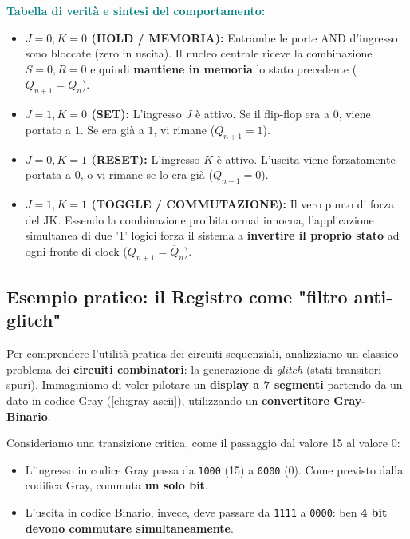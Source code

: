 \medskip
\noindent\textcolor{teal}{\textbf{Tabella di verità e sintesi del comportamento:}}
\begin{itemize}[leftmargin=1.5em,itemsep=4pt]
  \item \textbf{$J = 0, K = 0$ (HOLD / MEMORIA):} Entrambe le porte AND d'ingresso sono bloccate (zero in uscita). Il nucleo centrale riceve la combinazione $S=0, R=0$ e quindi \textbf{mantiene in memoria} lo stato precedente ($Q_{n+1}=Q_n$).
  \item \textbf{$J = 1, K = 0$ (SET):} L'ingresso $J$ è attivo. Se il flip-flop era a $0$, viene portato a $1$. Se era già a $1$, vi rimane ($Q_{n+1}=1$).
  \item \textbf{$J = 0, K = 1$ (RESET):} L'ingresso $K$ è attivo. L'uscita viene forzatamente portata a $0$, o vi rimane se lo era già ($Q_{n+1}=0$).
  \item \textbf{$J = 1, K = 1$ (TOGGLE / COMMUTAZIONE):} Il vero punto di forza del JK. Essendo la combinazione proibita ormai innocua, l'applicazione simultanea di due '1' logici forza il sistema a \textbf{invertire il proprio stato} ad ogni fronte di clock ($Q_{n+1}=\overline{Q}_n$).
\end{itemize}
\newpage
\subsection{Esempio pratico: il Registro come "filtro anti-glitch"}

Per comprendere l'utilità pratica dei circuiti sequenziali, analizziamo un classico problema dei \textbf{circuiti combinatori}: la generazione di \emph{glitch} (stati transitori spuri). Immaginiamo di voler pilotare un \textbf{display a 7 segmenti} partendo da un dato in codice Gray (\cref{ch:gray-ascii}), utilizzando un \textbf{convertitore Gray-Binario}.

Consideriamo una transizione critica, come il passaggio dal valore 15 al valore 0:
\begin{itemize}[leftmargin=1.5em,itemsep=2pt]
    \item L'ingresso in codice Gray passa da \texttt{1000} (15) a \texttt{0000} (0). Come previsto dalla codifica Gray, commuta \textbf{un solo bit}.
    \item L'uscita in codice Binario, invece, deve passare da \texttt{1111} a \texttt{0000}: ben \textbf{4 bit devono commutare simultaneamente}.
\end{itemize}

